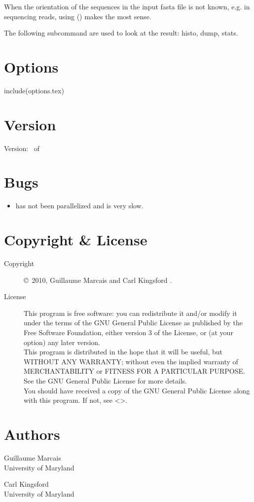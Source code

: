 \documentclass[english]{article}
\newcommand{\ddash}[1]{-\,-#1}
\newcommand{\LOpt}[1]{\Opt{\ddash{#1}}}
\begin{document}
When the orientation of the sequences in the input fasta file is not
known, e.g. in sequencing reads, using \LOpt{both-strands} ()
makes the most sense.

The following subcommand are used to look at the result: histo, dump, stats.

\section{Options}
include(options.tex)
\section{Version}

Version: \Version\ of \Date

\section{Bugs}

\begin{itemize}
\item {} has not been parallelized and is very
  slow.
\end{itemize}

\section{Copyright \& License}
\begin{description}
\item[Copyright] \copyright\ 2010, Guillaume Marcais  and Carl Kingsford .

\item[License] This program is free software: you can redistribute it
  and/or modify it under the terms of the GNU General Public License
  as published by the Free Software Foundation, either version 3 of
  the License, or (at your option) any later version. \\
  This program is distributed in the hope that it will be useful, but
  WITHOUT ANY WARRANTY; without even the implied warranty of
  MERCHANTABILITY or FITNESS FOR A PARTICULAR PURPOSE.  See the GNU
  General Public License for more details. \\
  You should have received a copy of the GNU General Public License
  along with this program.  If not, see
  <>.
\end{description}

\section{Authors}
\noindent
Guillaume Marcais \\
University of Maryland \\

Carl Kingsford \\
University of Maryland \\

\LatexManEnd
\end{document}
